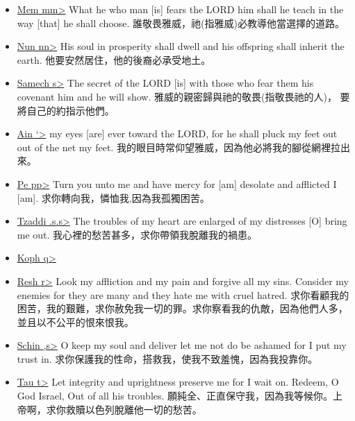 \begin{itemize}
\item \underline{Mem \<mm>} What he who man [is] fears the LORD him shall he teach in the way [that] he shall choose. 誰敬畏雅威，祂(指雅威)必教導他當選擇的道路。
\item \underline{Nun \<nn>} His soul in prosperity shall dwell and his offspring shall inherit the earth.  他要安然居住，他的後裔必承受地土。
\item \underline{Samech \<s>} The secret of the LORD [is] with those who fear them his covenant him and he will show. 雅威的親密歸與祂的敬畏(指敬畏祂的人)， 要將自己的約指示他們。
\item \underline{Ain \<`>}  my eyes [are] ever toward the LORD, for he shall pluck my feet out out of the net my feet. 我的眼目時常仰望雅威，因為他必將我的腳從網裡拉出來。
\item \underline{Pe \<pp>} Turn you unto me and have mercy for [am] desolate and afflicted I [am]. 求你轉向我，憐恤我,因為我孤獨困苦。

\item \underline{Tzaddi \<.s.s>} The troubles of my heart are enlarged of my distresses [O] bring me out. 我心裡的愁苦甚多，求你帶領我脫離我的禍患。
\item \underline{Koph \<q>} 
\item \underline{Resh  \<r>} Look my affliction and my pain and forgive all my sins. Consider my enemies for they are many and they hate me with cruel hatred. 求你看顧我的困苦，我的艱難，求你赦免我一切的罪。求你察看我的仇敵，因為他們人多，並且以不公平的恨來恨我。
\item \underline{Schin \<,s>} O keep my soul and deliver let me not do be ashamed for I put my trust in. 求你保護我的性命，搭救我，使我不致羞愧，因為我投靠你。
\item \underline{Tau \<t>} Let integrity and uprightness preserve me for I wait on. Redeem, O God Israel, Out of all his troubles. 願純全、正直保守我，因為我等候你。上帝啊，求你救贖以色列脫離他一切的愁苦。
\end{itemize}

